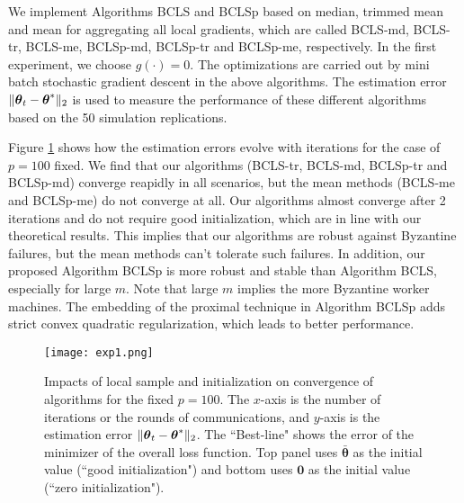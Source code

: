\documentclass[12pt,a4paper]{article}%
\newcommand \vc[1]{{\mbox{\boldmath${#1}$}}}
\numberwithin{equation}{section}
\begin{document}
We implement Algorithms BCLS and BCLSp based on median, trimmed mean and mean for aggregating all local gradients, which are called BCLS-md, BCLS-tr, BCLS-me, BCLSp-md, BCLSp-tr and BCLSp-me, respectively. In the first experiment, we choose $g(\cdot)=0$.
The optimizations are carried out by mini batch stochastic gradient descent in the above algorithms. The estimation error $\|\vc\theta_t-\vc\theta^*\|_2$ is used to measure the performance of these different algorithms based on the 50 simulation replications.

Figure \ref{figure1} shows how the estimation errors evolve with iterations for the case of $p=100$ fixed. We find that our algorithms (BCLS-tr, BCLS-md, BCLSp-tr and BCLSp-md) converge reapidly in all scenarios, but the mean methods (BCLS-me and BCLSp-me) do not converge at all. Our algorithms almost converge after 2 iterations and do not require good initialization, which are in line with our theoretical results. This implies that our algorithms are robust against Byzantine failures, but the mean methods can't tolerate such failures. In addition, our proposed Algorithm BCLSp is more robust and stable than Algorithm BCLS, especially for large $m$. Note that large $m$ implies the more Byzantine worker machines. The embedding of the proximal technique in Algorithm BCLSp adds strict convex quadratic regularization, which leads to better performance.

\begin{figure}[ht]
\centering
\texttt{[image: exp1.png]}
\caption{Impacts of local sample and initialization on convergence of algorithms for the fixed $p=100$. The $x$-axis is the number of iterations or the rounds of communications, and $y$-axis is the estimation error $\|\vc\theta_t-\vc\theta^*\|_2$. The ``Best-line" shows the error of the minimizer of the overall loss function. Top panel uses $\boldsymbol{\bar{\theta}}$ as the initial value (``good initialization") and bottom uses $\boldsymbol 0$ as the initial value (``zero initialization").}
\label{figure1}
\end{figure}
\end{document}
